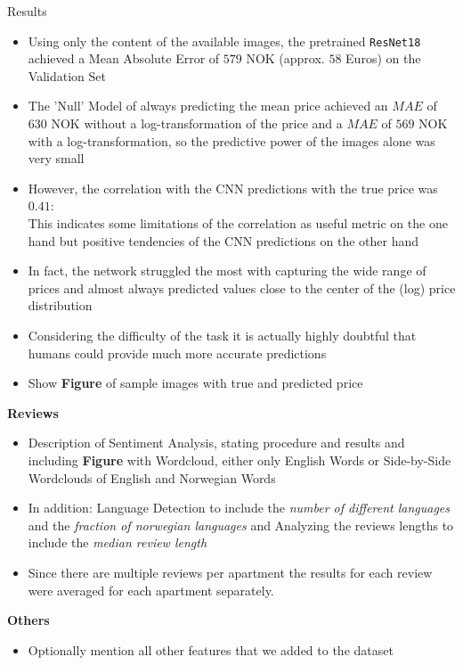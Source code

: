 \documentclass[12pt, letterpaper]{article}
\begin{document}
Results
\begin{itemize}
    \item Using only the content of the available images, the pretrained \texttt{ResNet18} achieved a Mean Absolute Error of $579$ NOK (approx. $58$ Euros) on the Validation Set
    \item The 'Null' Model of always predicting the mean price achieved an $MAE$ of $630$ NOK without a log-transformation of the price and a $MAE$ of $569$ NOK with a log-transformation, so the predictive power of the images alone was very small
    \item However, the correlation with the CNN predictions with the true price was $0.41$: \\
          This indicates some limitations of the correlation as useful metric on the one hand but positive tendencies of the CNN predictions on the other hand
    \item In fact, the network struggled the most with capturing the wide range of prices and almost always predicted values close to the center of the (log) price distribution
    \item Considering the difficulty of the task it is actually highly doubtful that humans could provide much more accurate predictions
    \item Show \textbf{Figure} of sample images with true and predicted price
\end{itemize}


\textbf{Reviews}
\begin{itemize}
    \item Description of Sentiment Analysis, stating procedure and results and including \textbf{Figure} with Wordcloud, either only English Words or Side-by-Side Wordclouds of English and Norwegian Words
    \item In addition: Language Detection to include the \emph{number of different languages} and the \emph{fraction of norwegian languages} and Analyzing the reviews lengths to include the \emph{median review length}
    \item Since there are multiple reviews per apartment the results for each review were averaged for each apartment separately.
\end{itemize}

\textbf{Others}
\begin{itemize}
    \item Optionally mention all other features that we added to the dataset
\end{itemize}
\end{document}
